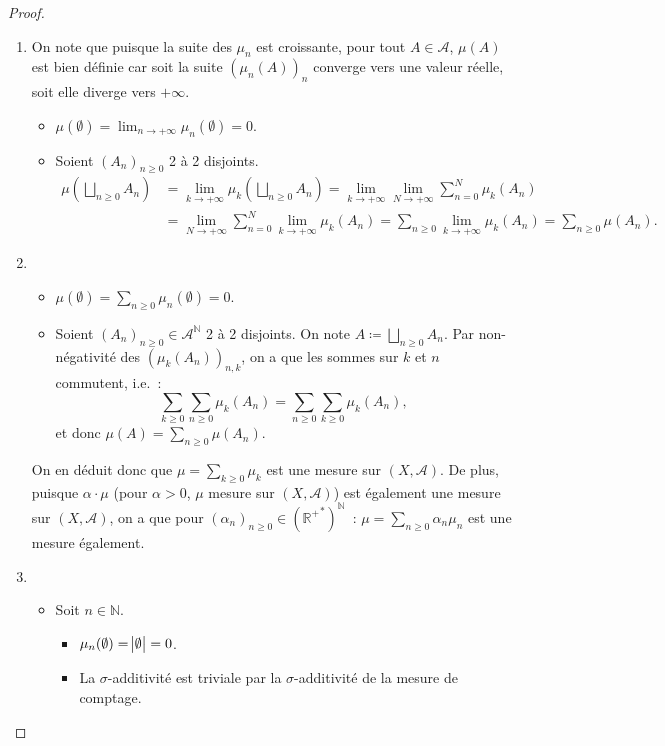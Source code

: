\documentclass{article}
\theoremstyle{definition}
\newcommand{\pinfty}{{+\infty}}
\newcommand{\N}{{\mathbb N}}
\newcommand{\R}{{\mathbb R}}
\begin{document}
\begin{proof}~
\begin{enumerate}
	\item On note que puisque la suite des $\mu_n$ est croissante, pour tout $A \in \mathcal A$, $\mu(A)$ est bien définie car soit la suite $(\mu_n(A))_n$ converge vers une
	valeur réelle, soit elle diverge vers $\pinfty$.
	\begin{itemize}
		\item $\mu(\emptyset) = \lim_{n \to \pinfty}\mu_n(\emptyset) = 0$.
		\item Soient $(A_n)_{n \geq 0}$ 2 à 2 disjoints.
		\begin{align*}
			\mu\left(\bigsqcup_{n \geq 0}A_n\right) &= \lim_{k \to \pinfty}\mu_k\left(\bigsqcup_{n \geq 0}A_n\right) = \lim_{k \to \pinfty}\lim_{N \to \pinfty}\sum_{n=0}^N\mu_k(A_n) \\
				&= \lim_{N \to \pinfty}\sum_{n=0}^N\lim_{k \to \pinfty}\mu_k(A_n) = \sum_{n \geq 0}\lim_{k \to \pinfty}\mu_k(A_n) = \sum_{n \geq 0}\mu(A_n).
		\end{align*}
	\end{itemize}
	\item~
	\begin{itemize}
		\item $\mu(\emptyset) = \sum_{n \geq 0}\mu_n(\emptyset) = 0$.
		\item Soient $(A_n)_{n \geq 0} \in \mathcal A^\N$ 2 à 2 disjoints. On note $A \coloneqq \bigsqcup_{n \geq 0}A_n$. Par non-négativité des $(\mu_k(A_n))_{n,k}$,
		on a que les sommes sur $k$ et $n$ commutent, i.e.~:
		\[\sum_{k \geq 0}\sum_{n \geq 0}\mu_k(A_n) = \sum_{n \geq 0}\sum_{k \geq 0}\mu_k(A_n),\]
		et donc $\mu(A) = \sum_{n \geq 0}\mu(A_n)$.
	\end{itemize}
	On en déduit donc que $\mu = \sum_{k \geq 0}\mu_k$ est une mesure sur $(X, \mathcal A)$. De plus, puisque $\alpha \cdot \mu$ (pour $\alpha > 0$, $\mu$ mesure sur $(X, \mathcal A)$)
	est également une mesure sur $(X, \mathcal A)$, on a que pour $(\alpha_n)_{n \geq 0} \in \left({\R^+}^*\right)^\N$~: $\mu = \sum_{n \geq 0}\alpha_n\mu_n$ est une mesure également.
	\item~
	\begin{itemize}
		\item Soit $n \in \N$.
		\begin{itemize}
			\item $\mu_n(\emptyset) = \abs \emptyset = 0$.
			\item La $\sigma$-additivité est triviale par la $\sigma$-additivité de la mesure de comptage.

\end{itemize}
\end{itemize}
\end{enumerate}
\end{proof}
\end{document}

